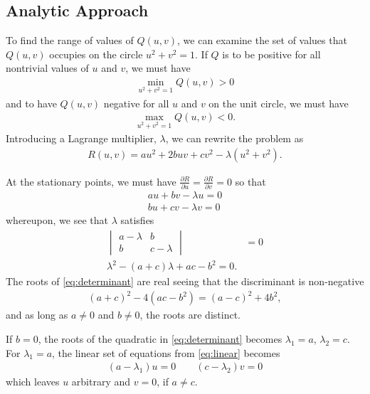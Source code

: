  \subsection{Analytic Approach}
%
To find the range of values of $Q(u,v)$, we can examine the set of values that $Q(u,v)$ occupies on the circle $u^2+v^2=1$. If $Q$ is to be positive for all nontrivial values of $u$ and $v$, we must have
%
\begin{align}
\min_{u^2+v^2=1} Q(u,v) > 0
\end{align}
%
and to have $Q(u,v)$ negative for all $u$ and $v$ on the unit circle, we must have
%
\begin{align}
\max_{u^2+v^2=1} Q(u,v) < 0.
\end{align}
%
Introducing a Lagrange multiplier, $\lambda$, we can rewrite the problem as 
%
\begin{align}
R(u,v) = au^2 + 2buv + cv^2 - \lambda (u^2 + v^2).
\end{align}

At the stationary points, we must have $\frac{\partial R}{\partial u} = \frac{\partial R}{\partial v} = 0$ so that
%
\begin{align}
au + bv - \lambda u = 0 \nonumber \\
bu + cv - \lambda v = 0
\label{eq:linear}
\end{align}
%
whereupon, we see that $\lambda$ satisfies 
%
\begin{align}
\begin{vmatrix}
a - \lambda & b \\
%
b & c-\lambda
\end{vmatrix} &= 0 \\
%
\lambda^2 - (a+c)\lambda + ac - b^2 = 0.
\label{eq:determinant}
\end{align}
%
The roots of \eqref{eq:determinant} are real seeing that the discriminant is non-negative \ie 
%
\begin{align}
	\left(a+c\right)^2 - 4\left(ac-b^2\right) = \left(a-c\right)^2 + 4b^2,
\end{align}
%
and as long as $a\neq 0$ and $b \neq 0$, the roots are distinct. 

If $b=0$, the roots of the quadratic in \eqref{eq:determinant} becomes $\lambda_1 = a$, $\lambda_2=c$. For $\lambda_1 = a$, the linear set of equations from \eqref{eq:linear} becomes 
%
\begin{align}
	\left(a-\lambda_1\right) u = 0 \qquad \left(c-\lambda_2\right) v = 0
\end{align}
%
which leaves $u$ arbitrary and $v=0$, if $a\neq c$.

